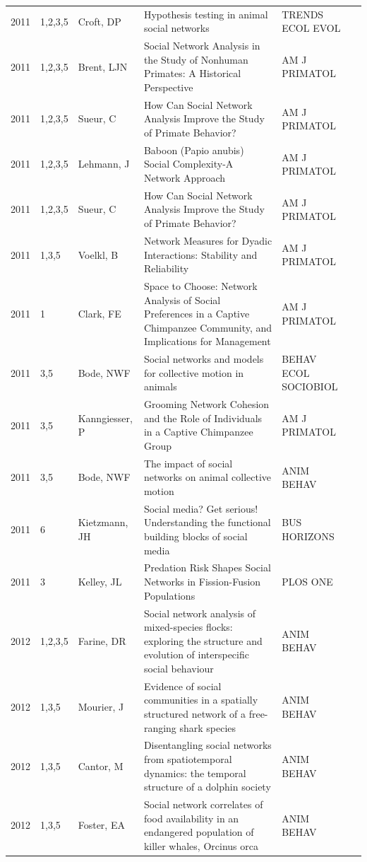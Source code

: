 \documentclass[11pt]{article} %
\begin{document}
\begin{longtable}{p{0.8cm}|p{1.25cm}|p{2.8cm}|p{7.5cm}|p{3cm}l}
2011&	1,2,3,5&	Croft, DP&	 Hypothesis testing in animal social networks&         	TRENDS ECOL EVOL\\
2011&	1,2,3,5&	Brent, LJN&	 Social Network Analysis in the Study of Nonhuman Primates: A Historical Perspective&         	AM J PRIMATOL\\
2011&	1,2,3,5&	Sueur, C&	 How Can Social Network Analysis Improve the Study of Primate Behavior?&         	AM J PRIMATOL\\
2011&	1,2,3,5&	Lehmann, J&	 Baboon (Papio anubis) Social Complexity-A Network Approach&         	AM J PRIMATOL\\
2011&	1,2,3,5&	Sueur, C&	 How Can Social Network Analysis Improve the Study of Primate Behavior?&         	AM J PRIMATOL\\
2011&	1,3,5&	Voelkl, B&	 Network Measures for Dyadic Interactions: Stability and Reliability&         	AM J PRIMATOL\\
2011&	1&	Clark, FE&	 Space to Choose: Network Analysis of Social Preferences in a Captive Chimpanzee Community, and Implications for Management&         	AM J PRIMATOL\\
2011&	3,5&	Bode, NWF&	 Social networks and models for collective motion in animals&         	BEHAV ECOL SOCIOBIOL\\
2011&	3,5&	Kanngiesser, P&	 Grooming Network Cohesion and the Role of Individuals in a Captive Chimpanzee Group&         	AM J PRIMATOL\\
2011&	3,5&	Bode, NWF&	 The impact of social networks on animal collective motion&         	ANIM BEHAV\\
2011&	6&	Kietzmann, JH&	 Social media? Get serious! Understanding the functional building blocks of social media&         	BUS HORIZONS\\
2011&	3&	Kelley, JL&	 Predation Risk Shapes Social Networks in Fission-Fusion Populations&         	PLOS ONE\\
2012&	1,2,3,5&	Farine, DR&	 Social network analysis of mixed-species flocks: exploring the structure and evolution of interspecific social behaviour&         	ANIM BEHAV\\
2012&	1,3,5&	Mourier, J&	 Evidence of social communities in a spatially structured network of a free-ranging shark species&         	ANIM BEHAV\\
2012&	1,3,5&	Cantor, M&	 Disentangling social networks from spatiotemporal dynamics: the temporal structure of a dolphin society&         	ANIM BEHAV\\
2012&	1,3,5&	Foster, EA&	 Social network correlates of food availability in an endangered population of killer whales, Orcinus orca&         	ANIM BEHAV\\

\end{longtable}
\end{document}
